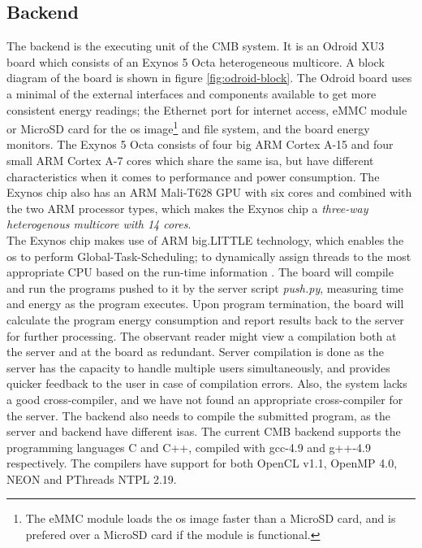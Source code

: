 \subsection{Backend}
\label{subsec:cmb-arch-backend}
The backend is the executing unit of the CMB system. It is an Odroid XU3 board \cite{XU3} which consists of an Exynos 5 Octa heterogeneous multicore. A block diagram of the board is shown in figure \ref{fig:odroid-block}.  The Odroid board uses a minimal of the external interfaces and components available to get more consistent energy readings; the Ethernet port for internet access, eMMC module or MicroSD card for the \gls{os} image\footnote{The eMMC module loads the \gls{os} image faster than a MicroSD card, and is prefered over a MicroSD card if the module is functional.} and file system, and the board energy monitors. The Exynos 5 Octa consists of four big ARM Cortex A-15 and four small ARM Cortex A-7 cores which share the same \gls{isa}, but have different characteristics when it comes to performance and power consumption. The Exynos chip also has an ARM Mali-T628 GPU with six cores and combined with the two ARM processor types, which makes the Exynos chip a \textit{three-way heterogenous multicore with 14 cores}. \\

The Exynos chip makes use of ARM big.LITTLE technology, which enables the \gls{os} to perform Global-Task-Scheduling; to dynamically assign threads to the most appropriate CPU based on the run-time information \cite{ABL}. The board will compile and run the programs pushed to it by the server script \textit{push.py}, measuring time and energy as the program executes. Upon program termination, the board will calculate the program energy consumption and report results back to the server for further processing. The observant reader might view a compilation both at the server and at the board as redundant. Server compilation is done as the server has the capacity to handle multiple users simultaneously, and provides quicker feedback to the user in case of compilation errors. Also, the system lacks a good cross-compiler, and we have not found an appropriate cross-compiler for the server. The backend also needs to compile the submitted program, as the server and backend have different \gls{isa}s. The current CMB backend supports the programming languages C and C++, compiled with gcc-4.9 and g++-4.9 respectively. The compilers have support for both OpenCL v1.1, OpenMP 4.0, NEON and PThreads NTPL 2.19.


